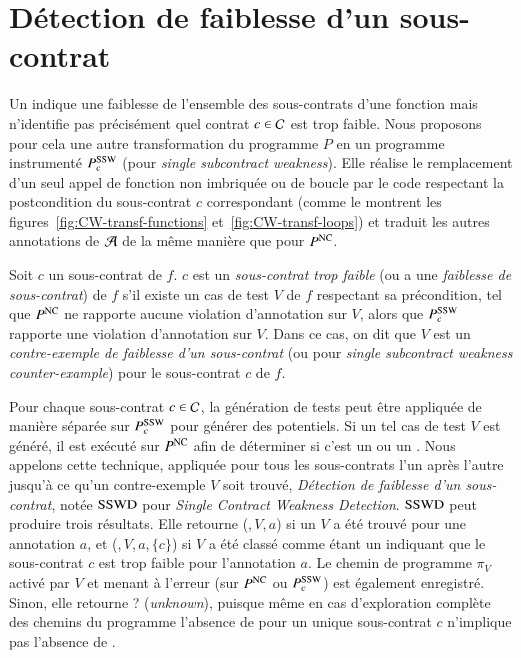 \section{Détection de faiblesse d'un sous-contrat}
\label{sec:swd-single}


Un \GSWCE indique une faiblesse de l'ensemble des sous-contrats d'une fonction
mais n'identifie pas précisément quel contrat $c\in{\ensuremath\mathcal{C}}$ est trop faible.
Nous proposons pour cela une autre transformation du programme $P$ en un
programme instrumenté $P_c^{\mathrm{SSW}}$ (pour {\em single subcontract weakness}).
Elle réalise le remplacement d'un seul appel de fonction non imbriquée ou de
boucle par le code respectant la postcondition du sous-contrat $c$ correspondant
(comme le montrent les figures~\ref{fig:CW-transf-functions}
et~\ref{fig:CW-transf-loops}) et traduit les autres annotations de ${\mathcal{A}}$ de la
même manière que pour $P^{\mathrm{NC}}$.

\begin{definition} 
  \label{def:SSW}
  Soit $c$ un sous-contrat de $f$.
  $c$ est un \emph{sous-contrat trop faible} (ou a une
  \emph{faiblesse de sous-contrat}) de $f$ s'il existe un cas de test $V$ de
   $f$ respectant sa précondition, tel que $P^{\mathrm{NC}}$ ne rapporte aucune violation
  d'annotation sur $V$, alors que $P_c^{\mathrm{SSW}}$ rapporte une violation
  d'annotation sur $V$.
  Dans ce cas, on dit que $V$ est un
  \emph{contre-exemple de faiblesse d'un sous-contrat} (ou \SSWCE pour
  \textit{single subcontract weakness counter-example}) pour le sous-contrat
  $c$ de $f$.
\end{definition}

Pour chaque sous-contrat $c\in{\ensuremath\mathcal{C}}$, la génération de tests peut être appliquée
de manière séparée sur $P_{c}^{\mathrm{SSW}}$ pour générer des \SSWCE potentiels.
Si un tel cas de test $V$ est généré, il est exécuté sur $P^{\mathrm{NC}}$ afin de
déterminer si c'est un \NCCE ou un \SSWCE.
Nous appelons cette technique, appliquée pour tous les sous-contrats l'un après
l'autre jusqu'à ce qu'un contre-exemple $V$ soit trouvé,
\emph{Détection de faiblesse d'un sous-contrat}, notée $\mathrm{SSWD}$ pour
\textit{Single Contract Weakness Detection}.
$\mathrm{SSWD}$ peut produire trois résultats.
Elle retourne (\nc,\,$V$,\,$a$) si un \NCCE $V$ a été trouvé pour une annotation
$a$, et (\cw,\,$V$,\,$a$,\,$\{c\}$) si $V$ a été classé comme étant un \SSWCE
indiquant que le sous-contrat $c$ est trop faible pour l'annotation $a$.
Le chemin de programme $\pi_V$ activé par $V$ et menant à l'erreur (sur $P^{\mathrm{NC}}$
ou $P_c^{\mathrm{SSW}}$) est également enregistré.
Sinon, elle retourne \textsf{?} ({\em unknown}), puisque même en cas
d'exploration complète des chemins du programme l'absence de \SSWCE pour un
unique sous-contrat $c$ n'implique pas l'absence de \GSWCE.

